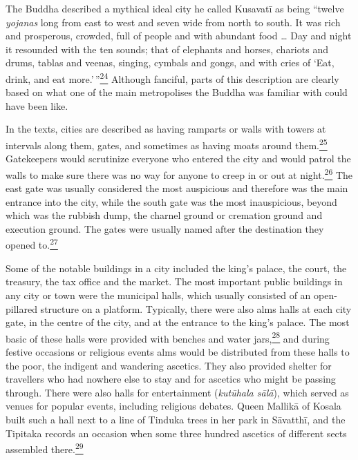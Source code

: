 The Buddha described a mythical ideal city he called Kusavatī as being
``twelve \emph{yojanas} long from east to west and seven wide from north
to south. It was rich and prosperous, crowded, full of people and with
abundant food \ldots{} Day and night it resounded with the ten sounds;
that of elephants and horses, chariots and drums, tablas and veenas,
singing, cymbals and gongs, and with cries of `Eat, drink, and eat
more.'\,''\label{footprints_split_006.html_fnref24}\hyperref[footprints_split_024.htmlux5cux23fn24]{\textsuperscript{24}}
Although fanciful, parts of this description are clearly based on what
one of the main metropolises the Buddha was familiar with could have
been like.

In the texts, cities are described as having ramparts or walls with
towers at intervals along them, gates, and sometimes as having moats
around
them.\label{footprints_split_006.html_fnref25}\hyperref[footprints_split_024.htmlux5cux23fn25]{\textsuperscript{25}}
Gatekeepers would scrutinize everyone who entered the city and would
patrol the walls to make sure there was no way for anyone to creep in or
out at
night.\label{footprints_split_006.html_fnref26}\hyperref[footprints_split_024.htmlux5cux23fn26]{\textsuperscript{26}}
The east gate was usually considered the most auspicious and therefore
was the main entrance into the city, while the south gate was the most
inauspicious, beyond which was the rubbish dump, the charnel ground or
cremation ground and execution ground. The gates were usually named
after the destination they opened
to.\label{footprints_split_006.html_fnref27}\hyperref[footprints_split_024.htmlux5cux23fn27]{\textsuperscript{27}}

Some of the notable buildings in a city included the king's palace, the
court, the treasury, the tax office and the market. The most important
public buildings in any city or town were the municipal halls, which
usually consisted of an open-pillared structure on a platform.
Typically, there were also alms halls at each city gate, in the centre
of the city, and at the entrance to the king's palace. The most basic of
these halls were provided with benches and water
jars,\label{footprints_split_006.html_fnref28}\hyperref[footprints_split_024.htmlux5cux23fn28]{\textsuperscript{28}}
and during festive occasions or religious events alms would be
distributed from these halls to the poor, the indigent and wandering
ascetics. They also provided shelter for travellers who had nowhere else
to stay and for ascetics who might be passing through. There were also
halls for entertainment (\emph{kutūhala sālā}), which served as venues
for popular events, including religious debates. Queen Mallikā of Kosala
built such a hall next to a line of Tinduka trees in her park in
Sāvatthī, and the Tipitaka records an occasion when some three hundred
ascetics of different sects assembled
there.\label{footprints_split_006.html_fnref29}\hyperref[footprints_split_024.htmlux5cux23fn29]{\textsuperscript{29}}

